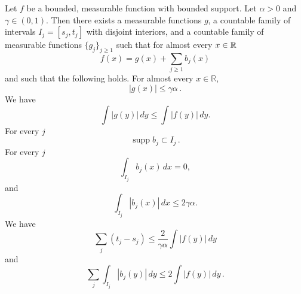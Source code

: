 {\begin{lemma}
    \label{lem-czd-func}
    Let $f$ be a bounded, measurable function with bounded support. Let $\alpha>0$ and $\gamma\in (0, 1)$. Then there exists a measurable functions $g$, a countable family of intervals $I_j = [s_j, t_j]$ with disjoint interiors, and a countable family of measurable functions $\{g_j\}_{j\geq 1}$ such that for almost every $x \in {\mathbb{R}}$
    \begin{equation}
       \label{eq-gb-dec}
       f(x)= g(x)+ \sum_{j\geq 1} b_j(x)
    \end{equation}
    and such that the following holds. For almost every $x\in \mathbb{R}$,
    \begin{equation}
        \label{eq-g-max}
       |g(x)|\leq \gamma\alpha\,.
    \end{equation}
    We have
    \begin{equation}
        \label{eq-g-L1-norm}
        \int |g(y)|\, dy\leq \int |f(y)|\, dy.
    \end{equation}
    For every $j$
    \begin{equation}
        \label{eq-supp-bj}
        \operatorname{supp} b_j \subset I_j\,.
    \end{equation}
    For every $j$
    \begin{equation}
        \label{eq-bad-mean-zero}
        \int_{I_j} b_j(x)\, dx=0,
    \end{equation}
    and
     \begin{equation}
        \label{eq-bj-L1}
        \int_{I_j} |b_j(x)|\, dx \leq 2\gamma\alpha.
    \end{equation}
    We have
    \begin{equation}
        \label{eq-bset-length-sum}
        \sum_j (t_j-s_j)\leq \frac{2}{\gamma\alpha}\int |f(y)|\, dy
    \end{equation}
    and
    \begin{equation}
    \label{eq-b-L1}
    \sum_{j}\int_{I_j} |b_j(y)|\, dy\leq 2 \int |f(y)|\, dy\,.
    \end{equation}
\end{lemma}

}
